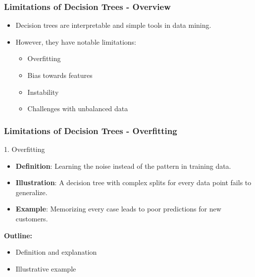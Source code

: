 \documentclass[aspectratio=169]{beamer}
\begin{document}
\begin{frame}[fragile]
    \frametitle{Limitations of Decision Trees - Overview}
    \begin{itemize}
        \item Decision trees are interpretable and simple tools in data mining.
        \item However, they have notable limitations:
        \begin{itemize}
            \item Overfitting
            \item Bias towards features
            \item Instability
            \item Challenges with unbalanced data
        \end{itemize}
    \end{itemize}
\end{frame}

\begin{frame}[fragile]
    \frametitle{Limitations of Decision Trees - Overfitting}
    \begin{block}{1. Overfitting}
        \begin{itemize}
            \item \textbf{Definition}: Learning the noise instead of the pattern in training data.
            \item \textbf{Illustration}: A decision tree with complex splits for every data point fails to generalize.
            \item \textbf{Example}: Memorizing every case leads to poor predictions for new customers.
        \end{itemize}
    \end{block}
    \textbf{Outline:}
    \begin{itemize}
        \item Definition and explanation
        \item Illustrative example
    \end{itemize}
\end{frame}
\end{document}
